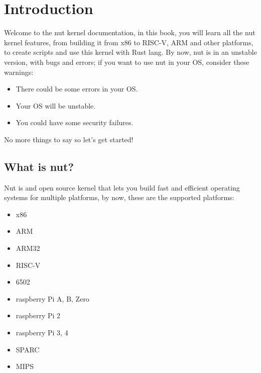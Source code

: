 \documentclass{article}
\begin{document}
  \section{Introduction}
  Welcome to the nut kernel documentation, in this book, you will learn all the nut kernel features, from building it from x86 to RISC-V, ARM and other platforms, to create scripts and use this kernel with Rust lang. By now, nut is in an unstable version, with bugs and errors; if you want to use nut in your OS, consider these warnings:
  \begin{itemize}
    \item There could be some errors in your OS.
    \item Your OS will be unstable.
    \item You could have some security failures.
  \end{itemize}
  No more things to say so let's get started!
  \\
  \subsection{What is nut?}
  Nut is and open source kernel that lets you build fast and efficient operating systems for multiple platforms, by now, these are the supported platforms:
  \begin{itemize}
    \item x86
    \item ARM
    \item ARM32
    \item RISC-V
    \item 6502
    \item raspberry Pi A, B, Zero
    \item raspberry Pi 2
    \item raspberry Pi 3, 4
    \item SPARC
    \item MIPS
  \end{itemize}
\end{document}
